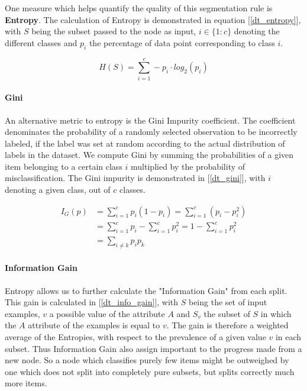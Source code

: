 		\par
		One measure which helps quantify the quality of this segmentation rule is \textbf{Entropy}. The calculation of Entropy is demonstrated in equation [\ref{dt_entropy}], with $ S $ being the subset passed to the node as input, $ i \in \{1:c \} $ denoting the different classes and $ p_i $ the percentage of data point corresponding to class $ i $. 
		
		\begin{equation}
			H(S) = \sum_{i=1}^c - p_i \cdot log_2 (p_i)
			\label{dt_entropy}
		\end{equation}
		
	 \paragraph{Gini}
	 	An alternative metric to entropy is the Gini Impurity coefficient. The coefficient denominates the probability of a randomly selected observation to be incorrectly labeled, if the label was set at random according to the actual distribution of labels in the dataset. We compute Gini by summing the probabilities of a given item belonging to a certain class $ i $ multiplied by the probability of misclassification. The Gini impurity is demonstrated in [\ref{dt_gini}], with $ i $ denoting a given class, out of $ c $ classes.
	 	
	 \begin{equation}
	 	\begin{aligned}
		 	I_G(p) &= \sum_{i=1}^c p_i(1-p_i) = \sum_{i=1}^c (p_i-p_i^2) \\  &=\sum_{i=1}^c p_i - \sum_{i=1}^c p_i^2 = 1 - \sum_{i=1}^c p_i^2 \\ &= \sum_{i \neq k} p_i p_k
	 	\end{aligned}
		\label{dt_gini}
	 \end{equation}
	 
	 \paragraph{Information Gain}	
	 	Entropy allows us to further calculate the "Information Gain" from each split. This gain is calculated in [\ref{dt_info_gain}], with $ S $ being the set of input examples, $ v $ a possible value of the attribute $ A $ and $ S_v $ the subset of $ S $ in which the $ A $ attribute of the examples is equal to $ v $. The gain is therefore a weighted average of the Entropies, with respect to the prevalence of a given value $ v $ in each subset. Thus Information Gain also assign important to the progress made from a new node. So a node which classifies purely few items might be outweighed by one which does not split into completely pure subsets, but splits correctly much more items.
	 
